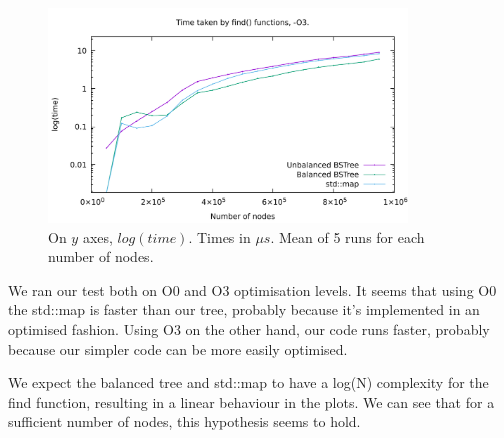 \documentclass[12pt,a4paper,openany]{scrartcl}
\begin{document}
    \begin{figure}[H]
        \centering
        \captionsetup{format=plain}
        \caption{On $y$ axes, $log(time)$. Times in $\mu s$. Mean of 5 runs for each number of nodes.}
        \label{fig:O3}
        \includegraphics[width=0.85\textwidth]{img/plotO3.pdf}
    \end{figure}
    
    	
	We ran our test both on O0 and O3 optimisation levels. It seems that using O0 the std::map is faster than our tree, probably because it's implemented in an optimised fashion. Using O3 on the other hand, our code runs faster, probably because our simpler code can be more easily optimised.
	
	We expect the balanced tree and std::map to have a log(N) complexity for the find function, resulting in a linear behaviour in the plots. We can see that for a sufficient number of nodes, this hypothesis seems to hold. 
	
\end{document}
